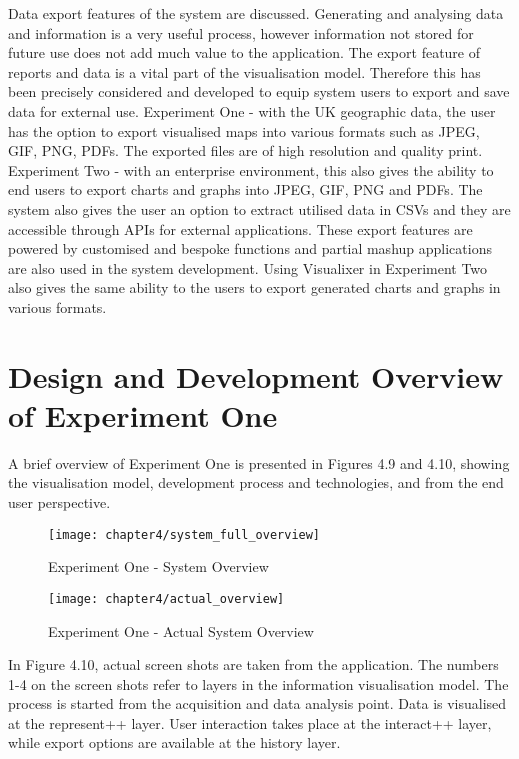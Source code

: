 Data export features of the system are discussed. Generating and analysing data and information is a very useful process, however information not stored for future use does not add much value to the application. The export feature of reports and data is a vital part of the visualisation model. Therefore this has been precisely considered and developed to equip system users to export and save data for external use. Experiment One -  with the UK geographic data, the user has the option to export visualised maps into various formats such as JPEG, GIF, PNG, PDFs. The exported files are of high resolution and quality print. Experiment Two - with an enterprise environment, this also gives the ability to end users to export charts and graphs into JPEG, GIF, PNG and PDFs. The system also gives the user an option to extract utilised data in CSVs and they are accessible through APIs for external applications. These export features are powered by customised and bespoke functions and partial mashup applications are also used in the system development. Using Visualixer in Experiment Two also gives the same ability to the users to export generated charts and graphs in various formats. 

\section{Design and Development Overview of Experiment One}

A brief overview of Experiment One is presented in Figures 4.9 and 4.10, showing the visualisation model, development process and technologies, and from the end user perspective. 

\begin{figure}
\centering
\texttt{[image: chapter4/system\_full\_overview]}
\caption{Experiment One - System Overview}
\end{figure}

\begin{figure}
\centering
\texttt{[image: chapter4/actual\_overview]}
\caption{Experiment One - Actual System Overview}
\end{figure}

In Figure 4.10, actual screen shots are taken from the application. The numbers 1-4 on the screen shots refer to layers in the information visualisation model. The process is started from the acquisition and data analysis point. Data is visualised at the represent++ layer. User interaction takes place at the interact++ layer, while export options are available at the history layer. 

